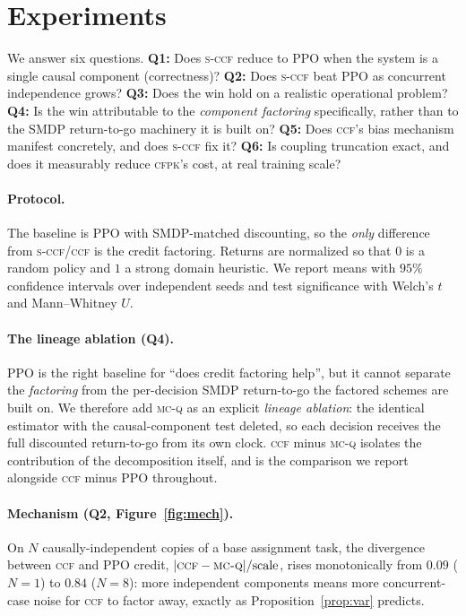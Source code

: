 \documentclass[review,authoryear,3p,times]{elsarticle}
\newcommand{\ccf}{\textsc{ccf}}
\newcommand{\sccf}{\textsc{s-ccf}}
\newcommand{\mcq}{\textsc{mc-q}}
\newcommand{\cfpk}{\textsc{cfpk}}
\begin{document}
\section{Experiments}
\label{sec:experiments}

We answer six questions. \textbf{Q1:} Does \sccf{} reduce to PPO when the
system is a single causal component (correctness)? \textbf{Q2:} Does \sccf{}
beat PPO as concurrent independence grows? \textbf{Q3:} Does the win hold on a
realistic operational problem? \textbf{Q4:} Is the win attributable to the
\emph{component factoring} specifically, rather than to the SMDP
return-to-go machinery it is built on? \textbf{Q5:} Does \ccf's bias mechanism
manifest concretely, and does \sccf{} fix it? \textbf{Q6:} Is coupling
truncation exact, and does it measurably reduce \cfpk's cost, at real
training scale?

\paragraph{Protocol.} The baseline is PPO with SMDP-matched discounting, so the
\emph{only} difference from \sccf{}/\ccf{} is the credit factoring. Returns are
normalized so that $0$ is a random policy and $1$ a strong domain heuristic. We
report means with $95\%$ confidence intervals over independent seeds and test
significance with Welch's $t$ and Mann--Whitney $U$.

\paragraph{The lineage ablation (Q4).} PPO is the right baseline for ``does
credit factoring help'', but it cannot separate the \emph{factoring} from the
per-decision SMDP return-to-go the factored schemes are built on. We therefore
add \mcq{} as an explicit \emph{lineage ablation}: the identical estimator with
the causal-component test deleted, so each decision receives the full
discounted return-to-go from its own clock. \ccf{} minus \mcq{} isolates the
contribution of the decomposition itself, and is the comparison we report
alongside \ccf{} minus PPO throughout.

\paragraph{Mechanism (Q2, Figure~\ref{fig:mech}).} On $N$ causally-independent
copies of a base assignment task, the divergence between \ccf{} and PPO credit,
$|\ccf-\mcq|/\text{scale}$, rises monotonically from $0.09$ ($N{=}1$) to $0.84$
($N{=}8$): more independent components means more concurrent-case noise for
\ccf{} to factor away, exactly as Proposition~\ref{prop:var} predicts.
\end{document}
